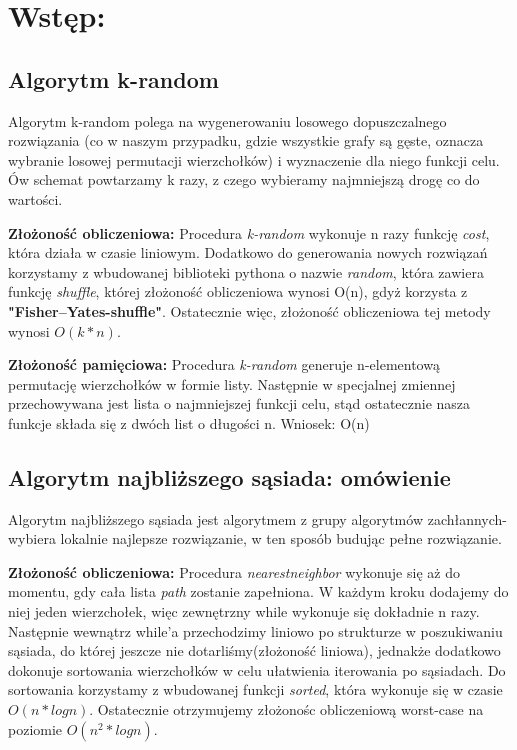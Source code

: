 \section{Wstęp: }
\subsection{Algorytm k-random}
  Algorytm k-random polega na wygenerowaniu losowego dopuszczalnego rozwiązania (co w naszym przypadku, gdzie wszystkie grafy są gęste, oznacza wybranie losowej permutacji wierzchołków) i wyznaczenie dla niego funkcji celu. Ów schemat powtarzamy k razy, z czego wybieramy najmniejszą drogę co do wartości.

  \textbf{Złożoność obliczeniowa:} Procedura \textit{k-random} wykonuje n razy funkcję \textit{cost}, która działa w czasie liniowym. Dodatkowo do generowania nowych rozwiązań korzystamy z wbudowanej biblioteki pythona o nazwie \textit{random}, która zawiera funkcję \textit{shuffle}, której złożoność obliczeniowa wynosi O(n), gdyż korzysta z \textbf{"Fisher–Yates-shuffle"}. Ostatecznie więc, złożoność obliczeniowa tej metody wynosi $O(k*n)$.

  \textbf{Złożoność pamięciowa: } Procedura \textit{k-random} generuje n-elementową permutację wierzchołków w formie listy. Następnie w specjalnej zmiennej przechowywana jest lista o najmniejszej funkcji celu, stąd ostatecznie nasza funkcje składa się z dwóch list o długości n. Wniosek: O(n)

\subsection{Algorytm najbliższego sąsiada: omówienie}
  Algorytm najbliższego sąsiada jest algorytmem z grupy algorytmów zachłannych- wybiera lokalnie najlepsze rozwiązanie, w ten sposób budując pełne rozwiązanie. 

  \textbf{Złożoność obliczeniowa:} Procedura \textit{nearestneighbor} wykonuje się aż do momentu, gdy cała lista \textit{path} zostanie zapełniona. W każdym kroku dodajemy do niej jeden wierzchołek, więc zewnętrzny while wykonuje się dokładnie n razy. Następnie wewnątrz while'a przechodzimy liniowo po strukturze w poszukiwaniu sąsiada, do której jeszcze nie dotarliśmy(złożoność liniowa), jednakże dodatkowo dokonuje sortowania wierzchołków w celu ułatwienia iterowania po sąsiadach. Do sortowania korzystamy z wbudowanej funkcji \textit{sorted}, która wykonuje się w czasie $O(n*logn)$. Ostatecznie otrzymujemy złożonośc obliczeniową worst-case na poziomie $O(n^{2}*logn)$.

